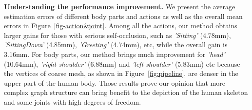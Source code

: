 \documentclass{bmvc2k}
\begin{document}
{\bf Understanding the performance improvement.}
We present the average estimation errors of different body parts and actions as well as the overall mean errors in Figure~\ref{fig-action&joint}. Among all the actions, our method obtains larger gains for those with serious self-occlusion, such as \textit{'Sitting'} (4.78mm), \textit{'SittingDown'} (4.85mm), \textit{'Greeting'} (4.74mm), etc, while the overall gain is 3.16mm. For body parts, our method brings much improvement for \textit{'head'} (10.64mm), \textit{'right shoulder'} (6.88mm) and \textit{'left shoulder'} (5.83mm) etc because the vertices of coarse mesh, as shown in Figure~\ref{fig:pipeline}, are denser in the upper part of the human body. Those results prove our opinion that more complex graph structure can bring benefit to the depiction of the human skeleton and some joints with high degrees of freedom.
\end{document}
